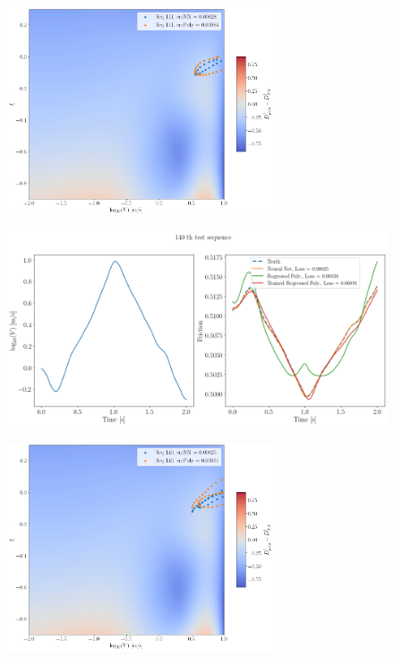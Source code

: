 \begin{figure}[H]
    \centering
    \includegraphics[width=0.7\textwidth]{images/Trial0216_errDdagger_seq111.png}
\end{figure}
\begin{figure}[H]
    \centering
    \includegraphics[width=1.0\textwidth]{images/polynomialRegressedTrainedSeq140.png}
\end{figure}
\begin{figure}[H]
    \centering
    \includegraphics[width=0.7\textwidth]{images/Trial0216_errDdagger_seq140.png}
\end{figure}



